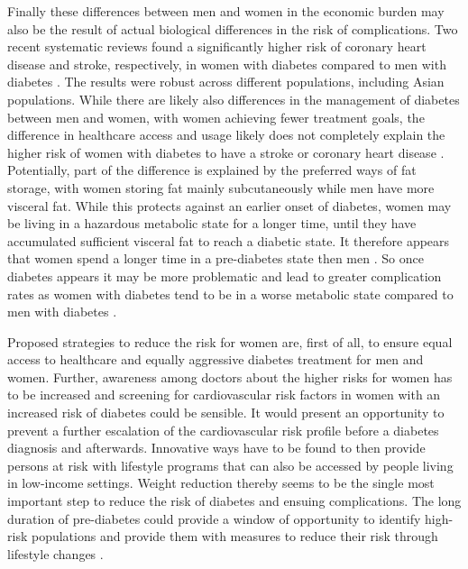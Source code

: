 Finally these differences between men and women in the economic burden may also be the result of actual biological differences in the risk of complications. Two recent systematic reviews found a significantly higher risk of coronary heart disease and stroke, respectively, in women with diabetes compared to men with diabetes \parencite{Peters2014a,Peters2014}. The results were robust across different populations, including Asian populations. While there are likely also differences in the management of diabetes between men and women, with women achieving fewer treatment goals, the difference in healthcare access and usage likely does not completely explain the higher risk of women with diabetes to have a stroke or coronary heart disease \parencite{Peters2015,Peters2014a,Peters2014}. Potentially, part of the difference is explained by the preferred ways of fat storage, with women storing fat mainly subcutaneously while men have more visceral fat. While this protects against an earlier onset of diabetes, women may be living in a hazardous metabolic state for a longer time, until they have accumulated sufficient visceral fat to reach a diabetic state. It therefore appears that women spend a longer time in a pre-diabetes state then men \parencite{Bertram2010}. So once diabetes appears it may be more problematic and lead to greater complication rates as women with diabetes tend to be in a worse metabolic state compared to men with diabetes \parencite{Peters2015}. 

Proposed strategies to reduce the risk for women are, first of all, to ensure equal access to healthcare and equally aggressive diabetes treatment for men and women. Further, awareness among doctors about the higher risks for women has to be increased and screening for cardiovascular risk factors in women with an increased risk of diabetes could be sensible. It would present an opportunity to prevent a further escalation of the cardiovascular risk profile before a diabetes diagnosis and afterwards. Innovative ways have to be found to then provide persons at risk with lifestyle programs that can also be accessed by people living in low-income settings. Weight reduction thereby seems to be the single most important step to reduce the risk of diabetes and ensuing complications. The long duration of pre-diabetes could provide a window of opportunity to identify high-risk populations and provide them with measures to reduce their risk through lifestyle changes \parencite{Peters2015}.

